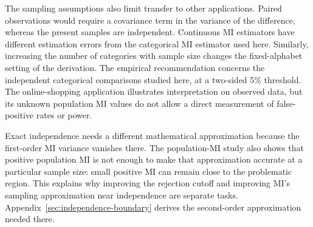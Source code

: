 The sampling assumptions also limit transfer to other applications.
Paired observations would require a covariance term in the variance of
the difference, whereas the present samples are independent. Continuous
MI estimators have different estimation errors from the categorical MI
estimator used here. Similarly, increasing the number of categories with
sample size changes the fixed-alphabet setting of the derivation. The empirical
recommendation concerns the independent categorical comparisons studied
here, at a two-sided 5\% threshold. The online-shopping application
illustrates interpretation on observed data, but its unknown population
MI values do not allow a direct measurement of false-positive rates or power.

Exact independence needs a different mathematical approximation because
the first-order MI variance vanishes there. The population-MI
study also shows that positive population MI is not enough to make that
approximation accurate at a particular sample size: small positive MI
can remain close to the problematic region. This explains why improving
the rejection cutoff and improving MI's sampling approximation near independence
are separate tasks.
Appendix~\ref{sec:independence-boundary} derives the second-order
approximation needed there.
